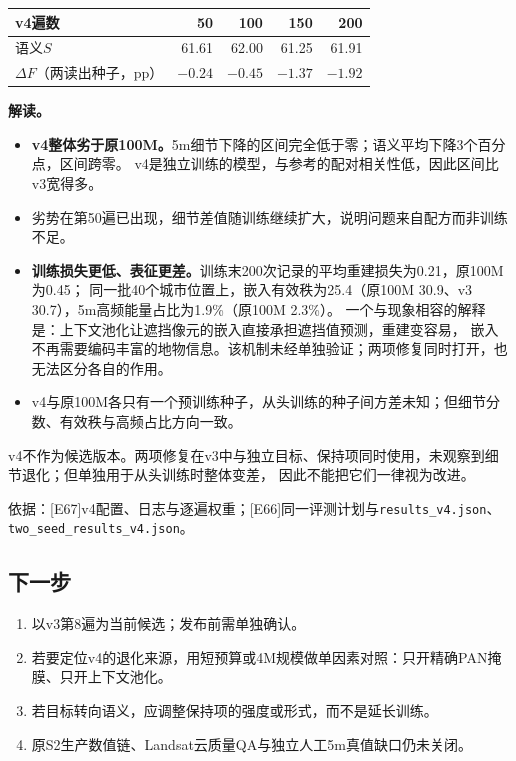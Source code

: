 \documentclass[UTF8,fontset=fandol,zihao=5,a4paper]{ctexart}
\newcommand{\source}[1]{\par{\footnotesize\color{muted}依据：#1}\par}
\begin{document}
\begin{center}\small
\begin{tabular}{@{}lrrrr@{}}
\toprule v4遍数 & 50 & 100 & 150 & 200\\\midrule
语义$S$ & 61.61 & 62.00 & 61.25 & 61.91\\
$\Delta F$（两读出种子，pp） & $-0.24$ & $-0.45$ & $-1.37$ & $-1.92$\\\bottomrule
\end{tabular}
\end{center}

\textbf{解读。}
\begin{itemize}
\item \textbf{v4整体劣于原100M。}5m细节下降的区间完全低于零；语义平均下降3个百分点，区间跨零。
v4是独立训练的模型，与参考的配对相关性低，因此区间比v3宽得多。
\item 劣势在第50遍已出现，细节差值随训练继续扩大，说明问题来自配方而非训练不足。
\item \textbf{训练损失更低、表征更差。}训练末200次记录的平均重建损失为0.21，原100M为0.45；
同一批40个城市位置上，嵌入有效秩为25.4（原100M 30.9、v3 30.7），5m高频能量占比为1.9\%（原100M 2.3\%）。
一个与现象相容的解释是：上下文池化让遮挡像元的嵌入直接承担遮挡值预测，重建变容易，
嵌入不再需要编码丰富的地物信息。该机制未经单独验证；两项修复同时打开，也无法区分各自的作用。
\item v4与原100M各只有一个预训练种子，从头训练的种子间方差未知；但细节分数、有效秩与高频占比方向一致。
\end{itemize}
v4不作为候选版本。两项修复在v3中与独立目标、保持项同时使用，未观察到细节退化；但单独用于从头训练时整体变差，
因此不能把它们一律视为改进。
\source{[E67]v4配置、日志与逐遍权重；[E66]同一评测计划与\texttt{results\_v4.json}、\texttt{two\_seed\_results\_v4.json}。}

\subsection{下一步}
\begin{enumerate}
\item 以v3第8遍为当前候选；发布前需单独确认。
\item 若要定位v4的退化来源，用短预算或4M规模做单因素对照：只开精确PAN掩膜、只开上下文池化。
\item 若目标转向语义，应调整保持项的强度或形式，而不是延长训练。
\item 原S2生产数值链、Landsat云质量QA与独立人工5m真值缺口仍未关闭\cite{landsatqa}。
\end{enumerate}
\end{document}
